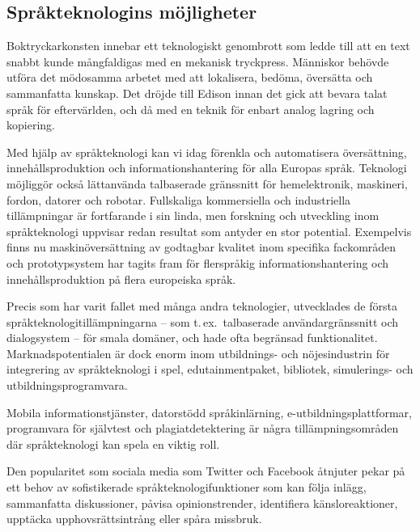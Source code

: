 \begin{multicols}{2}
\subsection{Språkteknologins möjligheter}

Boktryckarkonsten innebar ett teknologiskt genombrott som ledde till
att en text snabbt kunde mångfaldigas med en mekanisk
tryckpress. Människor behövde utföra det mödosamma arbetet med att
lokalisera, bedöma, översätta och sammanfatta kunskap. Det dröjde till
Edison innan det gick att bevara talat språk för eftervärlden, och då
med en teknik för enbart analog lagring och kopiering.

Med hjälp av språkteknologi kan vi idag förenkla och automatisera
översättning, innehållsproduktion och informationshantering för alla
Europas språk. Teknologi möjliggör också lättanvända talbaserade
gränssnitt för hemelektronik, maskineri, fordon, datorer och
robotar. Fullskaliga kommersiella och industriella tillämpningar är
fortfarande i sin linda, men forskning och utveckling inom
språkteknologi uppvisar redan resultat som antyder en stor
potential. Exempelvis finns nu maskin\-över\-sätt\-ning av godtagbar
kvalitet inom specifika fackområden och prototypsystem har tagits fram
för flerspråkig informationshantering och innehållsproduktion på flera
europeiska språk.

Precis som har varit fallet med många andra teknologier, utvecklades
de första språkteknologitillämpningarna -- som t.\,ex.~talbaserade
användargränssnitt och dia\-log\-sys\-tem -- för smala domäner, och hade
ofta begränsad funktionalitet. Marknadspotentialen är dock enorm inom
utbildnings- och nöjesindustrin för integrering av språkteknologi i
spel, edutainmentpaket, bibliotek, simulerings- och
utbildningsprogramvara. 

Mobila informationstjänster, datorstödd
språkinlärning, e-utbildningsplattformar, programvara för självtest
och plagiatdetektering är några tillämpningsområden där språkteknologi
kan spela en viktig roll. 

Den popularitet som sociala media som
Twitter och Facebook åtnjuter pekar på ett behov av sofistikerade
språkteknologifunktioner som kan följa inlägg, sammanfatta
diskussioner, påvisa opinionstrender, identifiera känsloreaktioner,
upptäcka upphovsrättsintrång eller spåra missbruk.



\end{multicols}
